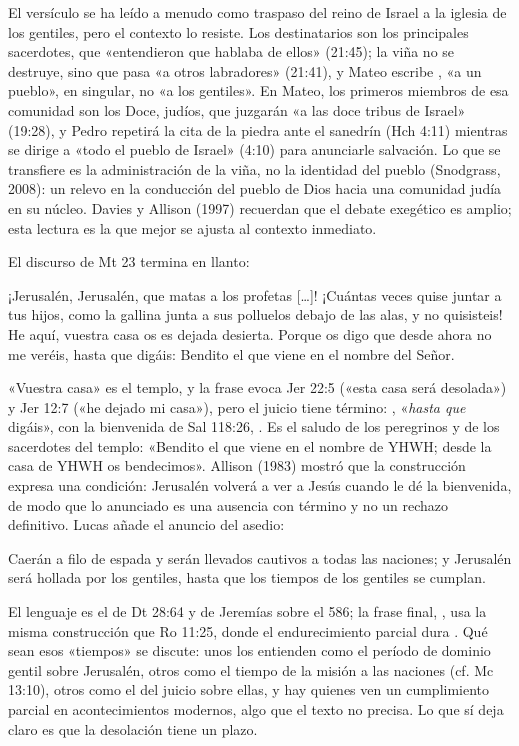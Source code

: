 El versículo se ha leído a menudo como traspaso del reino de Israel a la iglesia de los gentiles, pero el contexto lo resiste. Los destinatarios son los principales sacerdotes, que «entendieron que hablaba de ellos» (21:45); la viña no se destruye, sino que pasa «a otros labradores» (21:41), y Mateo escribe , «a un pueblo», en singular, no «a los gentiles». En Mateo, los primeros miembros de esa comunidad son los Doce, judíos, que juzgarán «a las doce tribus de Israel» (19:28), y Pedro repetirá la cita de la piedra ante el sanedrín (Hch 4:11) mientras se dirige a «todo el pueblo de Israel» (4:10) para anunciarle salvación. Lo que se transfiere es la administración de la viña, no la identidad del pueblo (Snodgrass, 2008): un relevo en la conducción del pueblo de Dios hacia una comunidad judía en su núcleo. Davies y Allison (1997) recuerdan que el debate exegético es amplio; esta lectura es la que mejor se ajusta al contexto inmediato.

El discurso de Mt 23 termina en llanto:

\begin{cita}¡Jerusalén, Jerusalén, que matas a los profetas [\ldots]! ¡Cuántas veces quise juntar a tus hijos, como la gallina junta a sus polluelos debajo de las alas, y no quisisteis! He aquí, vuestra casa os es dejada desierta. Porque os digo que desde ahora no me veréis, hasta que digáis: Bendito el que viene en el nombre del Señor.\end{cita}

«Vuestra casa» es el templo, y la frase evoca Jer 22:5 («esta casa será desolada») y Jer 12:7 («he dejado mi casa»), pero el juicio tiene término: , «\emph{hasta que} digáis», con la bienvenida de Sal 118:26, . Es el saludo de los peregrinos y de los sacerdotes del templo: «Bendito el que viene en el nombre de YHWH; desde la casa de YHWH os bendecimos». Allison (1983) mostró que la construcción expresa una condición: Jerusalén volverá a ver a Jesús cuando le dé la bienvenida, de modo que lo anunciado es una ausencia con término y no un rechazo definitivo. Lucas añade el anuncio del asedio:

\begin{cita}Caerán a filo de espada y serán llevados cautivos a todas las naciones; y Jerusalén será hollada por los gentiles, hasta que los tiempos de los gentiles se cumplan.\end{cita}

El lenguaje es el de Dt 28:64 y de Jeremías sobre el 586; la frase final, , usa la misma construcción que Ro 11:25, donde el endurecimiento parcial dura . Qué sean esos «tiempos» se discute: unos los entienden como el período de dominio gentil sobre Jerusalén, otros como el tiempo de la misión a las naciones (cf. Mc 13:10), otros como el del juicio sobre ellas, y hay quienes ven un cumplimiento parcial en acontecimientos modernos, algo que el texto no precisa. Lo que sí deja claro es que la desolación tiene un plazo.

